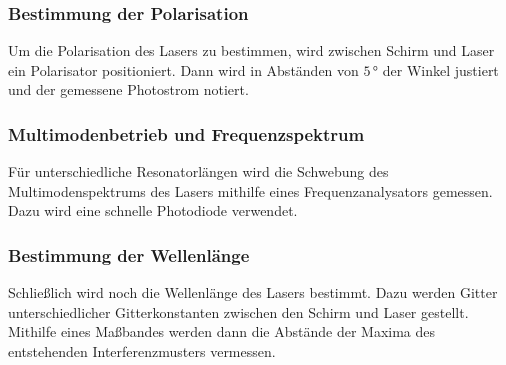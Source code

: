 \subsubsection{Bestimmung der Polarisation}

Um die Polarisation des Lasers zu bestimmen, wird zwischen Schirm und Laser ein Polarisator positioniert.
Dann wird in Abständen von $5 \, °$ der Winkel justiert und der gemessene Photostrom notiert.


\subsubsection{Multimodenbetrieb und Frequenzspektrum}

Für unterschiedliche Resonatorlängen wird die Schwebung des Multimodenspektrums des Lasers mithilfe eines Frequenzanalysators gemessen. 
Dazu wird eine schnelle Photodiode verwendet.


\subsubsection{Bestimmung der Wellenlänge}

Schließlich wird noch die Wellenlänge des Lasers bestimmt.
Dazu werden Gitter unterschiedlicher Gitterkonstanten zwischen den Schirm und Laser gestellt.
Mithilfe eines Maßbandes werden dann die Abstände der Maxima des entstehenden Interferenzmusters vermessen.
